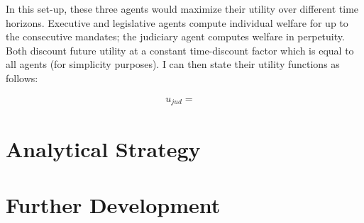 \documentclass[11pt]{article}
\begin{document}
In this set-up, these three agents would maximize their utility over different time horizons. Executive and legislative agents compute individual welfare for up to the consecutive mandates; the judiciary agent computes welfare in perpetuity. Both discount future utility at a constant time-discount factor which is equal to all agents (for simplicity purposes). I can then state their utility functions as follows:

\begin{equation} \label{eq:eq1}
  \begin{split}
    u_{jud}  = &
  \end{split}
\end{equation}

\section{Analytical Strategy} \label{sec:methods_paper2}

\section{Further Development} \label{sec:conclusion_paper2}

\clearpage

\setlength\bibsep{0pt}


\end{document}
